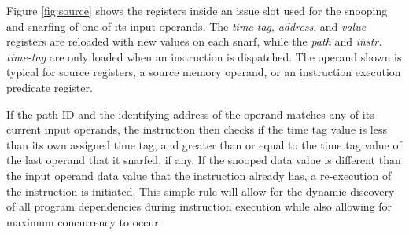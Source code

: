 \documentclass[10pt,twocolumn]{article}
\begin{document}
Figure \ref{fig:source} shows the registers inside an 
issue slot used for the snooping and snarfing of 
one of its input operands.  
The 
{\em time-tag},
{\em address}, and
{\em value} registers are reloaded with new values on each snarf,
while the
{\em path} and
{\em instr. time-tag} are only loaded when an instruction is
dispatched.
The operand shown is typical for source registers, a source memory
operand, or an instruction execution predicate register.
%
\begin{figure*}
\centering
{}
\caption{{\em Instruction Source Operand.} The registers and snooping
operation of one of several possible source operands is shown.
Just one operand forwarding bus is shown being snooped but
typically several operand forwarding buses are snooped simultaneously.}
\label{fig:source}
\end{figure*}
%

If the
path ID and the identifying address of the operand matches any of
its current input operands, the instruction then checks
if the time tag value is less than its own assigned time tag,
and greater than or equal to the time tag value of the last
operand that it snarfed, if any.  
If the snooped data value is
different than the input operand data value that the instruction 
already has, a re-execution of the instruction is initiated.
This simple rule will allow for the dynamic discovery of
all program dependencies during instruction execution while 
also allowing for maximum concurrency to occur.
%
%
\vspace{-0.25in}
\end{document}
